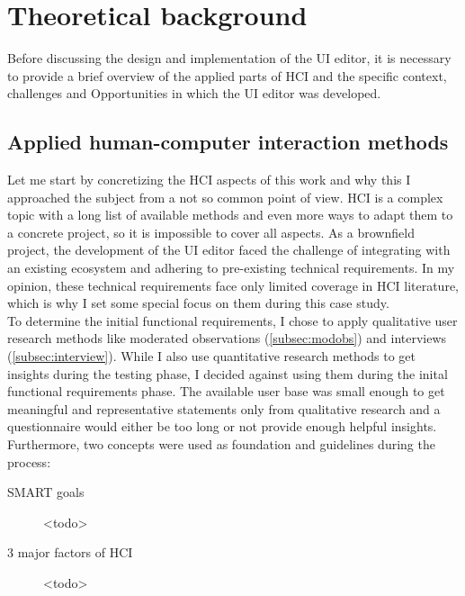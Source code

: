 
%
\chapter{Theoretical background}
\label{chap:background}

Before discussing the design and implementation of the UI editor, it is necessary to provide a brief overview of the applied parts of HCI and the specific context, challenges and Opportunities in which the UI editor was developed.
% 

\section{Applied human-computer interaction methods}

Let me start by concretizing the HCI aspects of this work and why this I approached the subject from a not so common point of view.
HCI is a complex topic with a long list of available methods and even more ways to adapt them to a concrete project, so it is impossible to cover all aspects.
As a \gls{brownfield} project,
the development of the UI editor faced the challenge of integrating with an existing ecosystem and adhering to pre-existing technical requirements.
In my opinion, these technical requirements face only limited coverage in HCI literature, which is why I set some special focus on them during this case study.
\\
To determine the initial functional requirements, I chose to apply qualitative user research methods like moderated observations (\ref{subsec:modobs}) and interviews (\ref{subsec:interview}).
While I also use quantitative research methods to get insights during the testing phase, I decided against using them during the inital functional requirements phase.
The available user base was small enough to get meaningful and representative statements only from qualitative research and a questionnaire would either be too long or not provide enough helpful insights.
\\
Furthermore, two concepts were used as foundation and guidelines during the process:
\begin{description}
  \item[SMART goals] <todo> 
  \item[3 major factors of HCI] <todo> 
\end{description}

